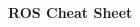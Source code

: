 \documentclass[10pt,landscape]{article}
\makeatletter
\renewcommand{\section}{\@startsection{section}{1}{0mm}%
                                {-0mm} %
                                {0.5mm}%
                                {\normalfont\large\bfseries}}
\makeatother
\begin{document}
\raggedright
\footnotesize
\begin{multicols}{3}


\setlength{\premulticols}{1pt}
\setlength{\postmulticols}{1pt}
\setlength{\multicolsep}{1pt}
\setlength{\columnsep}{2pt}

\begin{center}
     \Large{\textbf{ROS Cheat Sheet}} \\
\end{center}
\newlength{\MyLen}


\vspace{-3mm}

\end{multicols}
\end{document}
